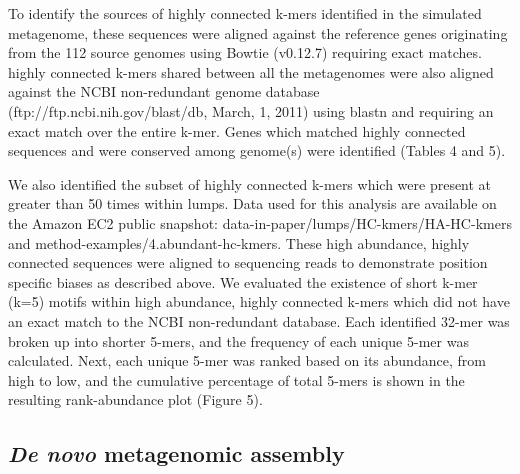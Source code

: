 \documentclass[10pt]{article}
\begin{document}
To identify the sources of highly connected k-mers identified in the simulated metagenome, these sequences were aligned against the reference genes originating from the 112 source genomes using Bowtie (v0.12.7) requiring exact matches.   highly connected k-mers shared between all the metagenomes were also aligned against the NCBI non-redundant genome database (ftp://ftp.ncbi.nih.gov/blast/db, March, 1, 2011) using blastn \cite{Altschul:1990p1335} and requiring an exact match over the entire k-mer.  Genes which matched highly connected sequences and were conserved among genome(s) were identified (Tables 4 and 5).

We also identified the subset of highly connected k-mers which were present at greater than 50 times within lumps. Data used for this analysis are available on the Amazon EC2 public snapshot: data-in-paper/lumps/HC-kmers/HA-HC-kmers and method-examples/4.abundant-hc-kmers. These high abundance, highly connected sequences were aligned to sequencing reads to demonstrate position specific biases as described above.   We evaluated the existence of short k-mer (k=5) motifs within high abundance, highly connected k-mers which did not have an exact match to the NCBI non-redundant database.  Each identified 32-mer was broken up into shorter 5-mers, and the frequency of each unique 5-mer was calculated.  Next, each unique 5-mer was ranked based on its abundance, from high to low, and the cumulative percentage of total 5-mers is shown in the resulting rank-abundance plot (Figure 5).
  
\subsection*{\emph{De novo} metagenomic assembly}
\end{document}
